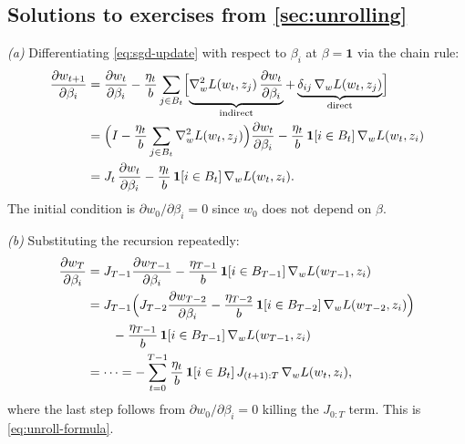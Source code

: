 \documentclass[11pt]{article}
\begin{document}
\begin{pdfonly}\begin{solutionsonly}
\subsection{Solutions to exercises from \cref{sec:unrolling}}
\end{solutionsonly}\end{pdfonly}

\begin{solution}

\textit{(a)} Differentiating \eqref{eq:sgd-update} with respect to $\beta_i$ at $\beta = \mathbf{1}$ via the chain rule:
\begin{align*}
  \frac{\partial w_{t+1}}{\partial \beta_i} &= \frac{\partial w_t}{\partial \beta_i} - \frac{\eta_t}{b}\sum_{j\in B_t}\Bigl[\underbrace{\nabla_w^2 L(w_t,z_j)\,\frac{\partial w_t}{\partial \beta_i}}_{\text{indirect}} + \underbrace{\delta_{ij}\,\nabla_w L(w_t,z_j)}_{\text{direct}}\Bigr] \\
  &= \Bigl(I - \frac{\eta_t}{b}\sum_{j\in B_t}\nabla_w^2 L(w_t,z_j)\Bigr)\frac{\partial w_t}{\partial \beta_i} - \frac{\eta_t}{b}\,\mathbf{1}[i\in B_t]\,\nabla_w L(w_t,z_i) \\
  &= J_t\,\frac{\partial w_t}{\partial \beta_i} - \frac{\eta_t}{b}\,\mathbf{1}[i\in B_t]\,\nabla_w L(w_t,z_i).
\end{align*}
The initial condition is $\partial w_0/\partial \beta_i = 0$ since $w_0$ does not depend on $\beta$.

\textit{(b)} Substituting the recursion repeatedly:
\begin{align*}
  \frac{\partial w_T}{\partial \beta_i} &= J_{T-1}\frac{\partial w_{T-1}}{\partial \beta_i} - \frac{\eta_{T-1}}{b}\,\mathbf{1}[i\in B_{T-1}]\,\nabla_w L(w_{T-1},z_i) \\
  &= J_{T-1}\Bigl(J_{T-2}\frac{\partial w_{T-2}}{\partial \beta_i} - \frac{\eta_{T-2}}{b}\,\mathbf{1}[i\in B_{T-2}]\,\nabla_w L(w_{T-2},z_i)\Bigr) \\
  &\qquad - \frac{\eta_{T-1}}{b}\,\mathbf{1}[i\in B_{T-1}]\,\nabla_w L(w_{T-1},z_i) \\
  &= \cdots = -\sum_{t=0}^{T-1}\frac{\eta_t}{b}\,\mathbf{1}[i\in B_t]\,J_{(t+1):T}\,\nabla_w L(w_t,z_i),
\end{align*}
where the last step follows from $\partial w_0/\partial \beta_i = 0$ killing the $J_{0:T}$ term. This is \eqref{eq:unroll-formula}.


\end{solution}
\end{document}
